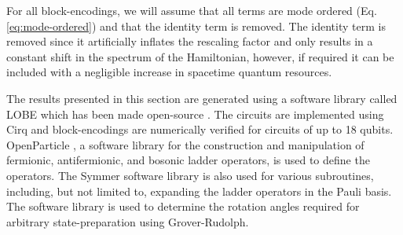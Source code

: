 For all block-encodings, we will assume that all terms are mode ordered (Eq. \ref{eq:mode-ordered}) and that the identity term is removed.
The identity term is removed since it artificially inflates the rescaling factor and only results in a constant shift in the spectrum of the Hamiltonian, however, if required it can be included with a negligible increase in spacetime quantum resources.

The results presented in this section are generated using a software library called LOBE which has been made open-source \cite{}.
The circuits are implemented using Cirq \cite{cirq} and block-encodings are numerically verified for circuits of up to 18 qubits.
OpenParticle \cite{openparticle}, a software library for the construction and manipulation of fermionic, antifermionic, and bosonic ladder operators, is used to define the operators.
The Symmer software library \cite{} is also used for various subroutines, including, but not limited to, expanding the ladder operators in the Pauli basis.
The software library \cite{grover-rudolph-github} is used to determine the rotation angles required for arbitrary state-preparation using Grover-Rudolph.







